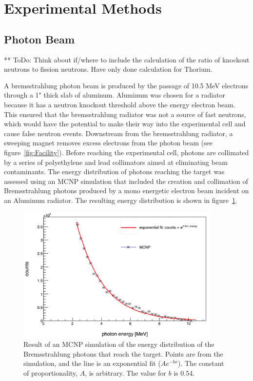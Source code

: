 \section{Experimental Methods}
\subsection{Photon Beam}
** ToDo: Think about if/where to include the calculation of the ratio of knockout neutrons to fission neutrons.
Have only done calculation for Thorium.

A bremsstrahlung photon beam is produced by the passage of 10.5 MeV electrons through a 1" thick slab of aluminum.
Aluminum was chosen for a radiator because it has a neutron knockout threshold above the energy electron beam.
This ensured that the bremsstrahlung radiator was not a source of fast neutrons, which would have the potential to make their way into the experimental cell and cause false neutron events.
Downstream from the bremsstrahlung radiator, a sweeping magnet removes excess electrons from the photon beam (see figure~\ref{fig:Facility}).
Before reaching the experimental cell, photons are collimated by a series of polyethylene and lead collimators aimed at eliminating beam contaminants.
The energy distribution of photons reaching the target was assessed using an MCNP simulation that included the creation and collimation of Bremsstrahlung photons produced by a mono energetic electron beam incident on an Aluminum radiator.
The resulting energy distribution is shown in figure~\ref{fig:BremDist}.

\begin{figure}[h]
\includegraphics[width=0.9\textwidth]{Content/Methods/MCNPBremDistribution.png}
\caption{Result of an MCNP simulation of the energy distribution of the Bremsstrahlung photons that reach the target.
Points are from the simulation, and the line is an exponential fit ($Ae^{-bx}$).
The constant of proportionality, $A$, is arbitrary. The value for $b$ is 0.54.}
\label{fig:BremDist}
\end{figure}

